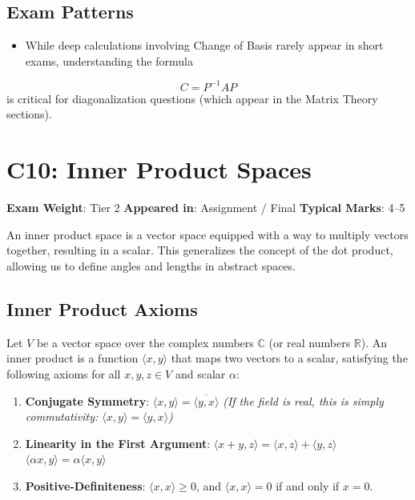 \documentclass[
]{article}
\providecommand{\tightlist}{%
  \setlength{\itemsep}{0pt}\setlength{\parskip}{0pt}}
\renewenvironment{quote}
  {\begin{tcolorbox}[
     colback=calloutbg,
     colframe=calloutframe,
     colupper=callouttext,
     arc=3pt,
     boxrule=0.5pt,
     leftrule=0.5pt,
     borderline west={3pt}{0pt}{calloutaccent},
     left=8pt,
     right=8pt,
     top=6pt,
     bottom=6pt
   ]}
  {\end{tcolorbox}}
\begin{document}
\subsection{Exam Patterns}\label{exam-patterns-37}

\begin{itemize}
\tightlist
\item
  While deep calculations involving Change of Basis rarely appear in
  short exams, understanding the formula
\end{itemize}
\[
C = P^{-1} A P
\]
is critical for diagonalization questions (which appear in the Matrix
Theory sections).

\section{C10: Inner Product Spaces}\label{c10-inner-product-spaces}

\begin{quote}
\textbf{Exam Weight}: Tier 2 \textbar{} \textbf{Appeared in}: Assignment
/ Final \textbar{} \textbf{Typical Marks}: 4--5
\end{quote}

An inner product space is a vector space equipped with a way to multiply
vectors together, resulting in a scalar. This generalizes the concept of
the dot product, allowing us to define angles and lengths in abstract
spaces.

\subsection{Inner Product Axioms}\label{inner-product-axioms}

Let \(V\) be a vector space over the complex numbers \(\mathbb{C}\) (or
real numbers \(\mathbb{R}\)). An inner product is a function
\(\langle x, y \rangle\) that maps two vectors to a scalar, satisfying
the following axioms for all \(x, y, z \in V\) and scalar \(\alpha\):

\begin{enumerate}
\def\labelenumi{\arabic{enumi}.}
\tightlist
\item
  \textbf{Conjugate Symmetry}:
  \(\langle x, y \rangle = \overline{\langle y, x \rangle}\) \emph{(If
  the field is real, this is simply commutativity:
  \(\langle x, y \rangle = \langle y, x \rangle\))}
\item
  \textbf{Linearity in the First Argument}:
  \(\langle x + y, z \rangle = \langle x, z \rangle + \langle y, z \rangle\)
  \(\langle \alpha x, y \rangle = \alpha \langle x, y \rangle\)
\item
  \textbf{Positive-Definiteness}: \(\langle x, x \rangle \geq 0\), and
  \(\langle x, x \rangle = 0\) if and only if \(x = 0\).
\end{enumerate}
\end{document}
